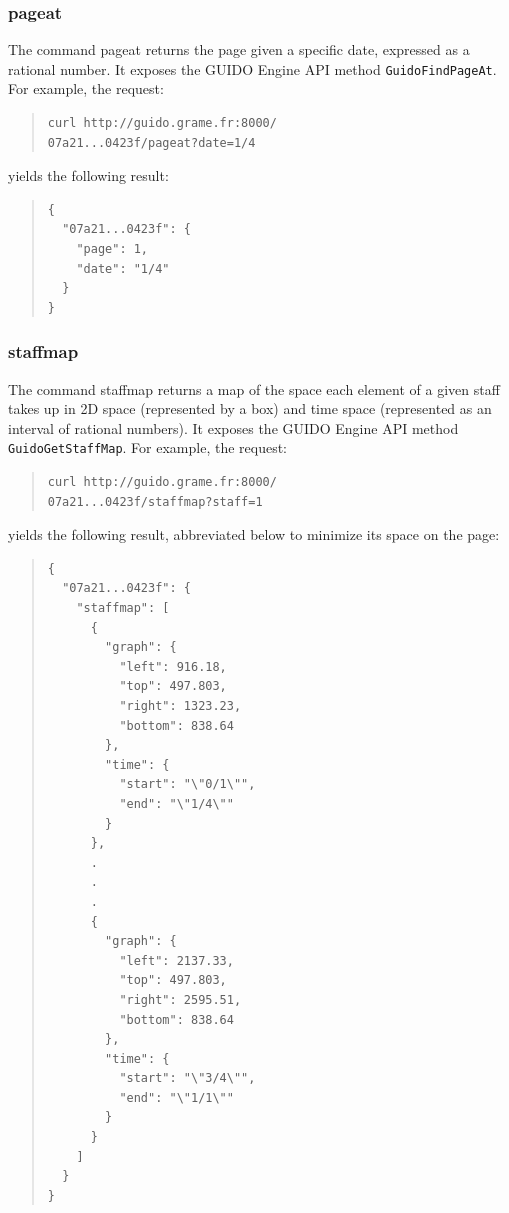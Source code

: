 \documentclass[11pt,a4paper]{article}
\newcommand{\guidosize}{7pt}
\begin{document}
\subsubsection{pageat}
The command pageat returns the page given a specific date, expressed as a rational number.  It exposes the GUIDO Engine API method \verb=GuidoFindPageAt=.  For example, the request:
\begin{quote}
\begingroup
\fontsize{\guidosize}{12pt}\selectfont
\begin{verbatim}
curl http://guido.grame.fr:8000/
07a21...0423f/pageat?date=1/4
\end{verbatim}
\endgroup
\end{quote}
yields the following result:
\begin{quote}
\begingroup
\fontsize{\guidosize}{12pt}\selectfont
\begin{verbatim}
{
  "07a21...0423f": {
    "page": 1,
    "date": "1/4"
  }
}
\end{verbatim}
\endgroup
\end{quote}

\subsubsection{staffmap}\label{subsection:staffmap}
The command staffmap returns a map of the space each element of a given staff takes up in 2D space (represented by a box) and time space (represented as an interval of rational numbers).  It exposes the GUIDO Engine API method \verb=GuidoGetStaffMap=.  For example, the request:
\begin{quote}
\begingroup
\fontsize{\guidosize}{12pt}\selectfont
\begin{verbatim}
curl http://guido.grame.fr:8000/
07a21...0423f/staffmap?staff=1
\end{verbatim}
\endgroup
\end{quote}
yields the following result, abbreviated below to minimize its space on the page:
\begin{quote}
\begingroup
\fontsize{\guidosize}{12pt}\selectfont
\begin{verbatim}
{
  "07a21...0423f": {
    "staffmap": [
      {
        "graph": {
          "left": 916.18,
          "top": 497.803,
          "right": 1323.23,
          "bottom": 838.64
        },
        "time": {
          "start": "\"0/1\"",
          "end": "\"1/4\""
        }
      },
      .
      .
      .
      {
        "graph": {
          "left": 2137.33,
          "top": 497.803,
          "right": 2595.51,
          "bottom": 838.64
        },
        "time": {
          "start": "\"3/4\"",
          "end": "\"1/1\""
        }
      }
    ]
  }
}
\end{verbatim}
\endgroup
\end{quote}
\end{document}
